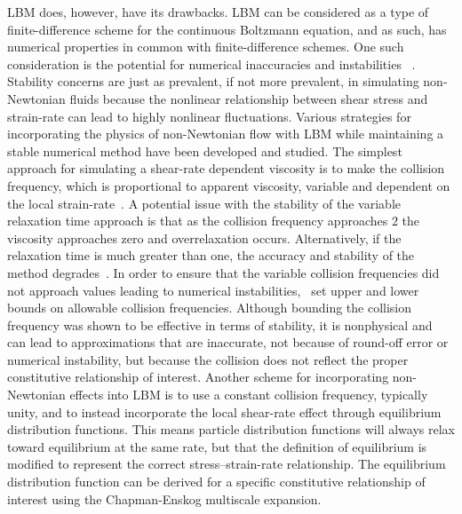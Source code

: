 LBM does, however, have its drawbacks.
LBM can be considered as a type of finite-difference scheme for the continuous Boltzmann equation, and as such, has numerical properties in common with finite-difference schemes.
One such consideration is the potential for numerical inaccuracies and instabilities ~\cite{sterling1993stability,sterling1996stability,bawazeer2013stability,lallemand2000theory}.
Stability concerns are just as prevalent, if not more prevalent, in simulating non-Newtonian fluids because the nonlinear relationship between shear stress and strain-rate can lead to highly nonlinear fluctuations.
Various strategies for incorporating the physics of non-Newtonian flow with LBM while maintaining a stable numerical method have been developed and studied.
The simplest approach for simulating a shear-rate dependent viscosity is to make the collision frequency, which is proportional to apparent viscosity, variable and dependent on the local strain-rate~\cite{boyd2006second,chen2014simulations,fallah2012multiple,tang2011bingham,svec2011flow,svec2012free,zhao2016lattice}.
A potential issue with the stability of the variable relaxation time approach is that as the collision frequency approaches $2$ the viscosity approaches zero and overrelaxation occurs.
Alternatively, if the relaxation time is much greater than one, the accuracy and stability of the method degrades~\cite{latt2007hydrodynamic}. 
In order to ensure that the variable collision frequencies did not approach values leading to numerical instabilities,~\cite{svec2011flow,svec2012free,gabbanelli2005lattice} set upper and lower bounds on allowable collision frequencies.
Although bounding the collision frequency was shown to be effective in terms of stability, it is nonphysical and can lead to approximations that are inaccurate, not because of round-off error or numerical instability, but because the collision does not reflect the proper constitutive relationship of interest.
Another scheme for incorporating non-Newtonian effects into LBM is to use a constant collision frequency, typically unity, and to instead incorporate the local shear-rate effect through equilibrium distribution functions.
This means particle distribution functions will always relax toward equilibrium at the same rate, but that the definition of equilibrium is modified to represent the correct stress--strain-rate relationship.
The equilibrium distribution function can be derived for a specific constitutive relationship of interest using the Chapman-Enskog multiscale expansion.
